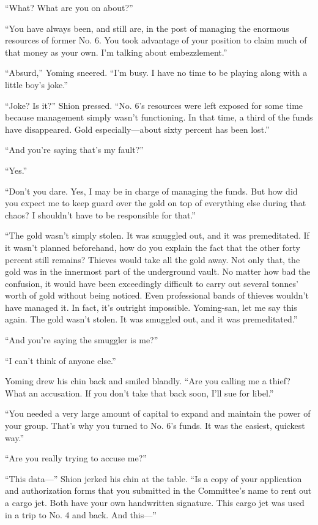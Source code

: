 ``What? What are you on about?''

``You have always been, and still are, in the post of managing the
enormous resources of former No. 6. You took advantage of your position
to claim much of that money as your own. I'm talking about
embezzlement.''

``Absurd,'' Yoming sneered. ``I'm busy. I have no time to be playing
along with a little boy's joke.''

``Joke? Is it?'' Shion pressed. ``No. 6's resources were left exposed
for some time because management simply wasn't functioning. In that
time, a third of the funds have disappeared. Gold especially---about sixty
percent has been lost.''

``And you're saying that's my fault?''

``Yes.''

``Don't you dare. Yes, I may be in charge of managing the funds. But how
did you expect me to keep guard over the gold on top of everything else
during that chaos? I shouldn't have to be responsible for that.''

``The gold wasn't simply stolen. It was smuggled out, and it was
premeditated. If it wasn't planned beforehand, how do you explain the
fact that the other forty percent still remains? Thieves would take all
the gold away. Not only that, the gold was in the innermost part of the
underground vault. No matter how bad the confusion, it would have been
exceedingly difficult to carry out several tonnes' worth of gold without
being noticed. Even professional bands of thieves wouldn't have managed
it. In fact, it's outright impossible. Yoming-san, let me say this
again. The gold wasn't stolen. It was smuggled out, and it was
premeditated.''

``And you're saying the smuggler is me?''

``I can't think of anyone else.''

Yoming drew his chin back and smiled blandly. ``Are you calling me a
thief? What an accusation. If you don't take that back soon, I'll sue
for libel.''

``You needed a very large amount of capital to expand and maintain the
power of your group. That's why you turned to No. 6's funds. It was the
easiest, quickest way.''

``Are you really trying to accuse me?''

``This data---'' Shion jerked his chin at the table. ``Is a copy of your
application and authorization forms that you submitted in the
Committee's name to rent out a cargo jet. Both have your own handwritten
signature. This cargo jet was used in a trip to No. 4 and back. And
this---''

